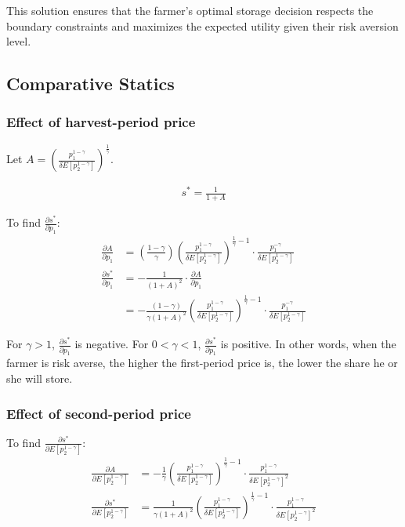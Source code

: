 \documentclass[12pt]{article}
\begin{document}
This solution ensures that the farmer's optimal storage decision respects the boundary constraints and maximizes the expected utility given their risk aversion level.


\subsection{Comparative Statics}

\subsubsection{Effect of harvest-period price}

Let $A = \left( \frac{p_1^{1 - \gamma}}{\delta E[p_2^{1 - \gamma}]} \right)^{\frac{1}{\gamma}}$.

\begin{align*}
    s^* = \frac{1}{1 + A}
\end{align*}

To find $\frac{\partial s^*}{\partial p_1}$:
\begin{align*}
    \frac{\partial A}{\partial p_1} &= \left( \frac{1 - \gamma}{\gamma} \right) \left( \frac{p_1^{1 - \gamma}}{\delta E[p_2^{1 - \gamma}]} \right)^{\frac{1}{\gamma} - 1} \cdot \frac{p_1^{-\gamma}}{\delta E[p_2^{1 - \gamma}]} \\
    \frac{\partial s^*}{\partial p_1} &= -\frac{1}{(1 + A)^2} \cdot \frac{\partial A}{\partial p_1} \\
    &= -\frac{(1 - \gamma)}{\gamma (1 + A)^2} \left( \frac{p_1^{1 - \gamma}}{\delta E[p_2^{1 - \gamma}]} \right)^{\frac{1}{\gamma} - 1} \cdot \frac{p_1^{-\gamma}}{\delta E[p_2^{1 - \gamma}]}
\end{align*}

For $\gamma > 1$, $\frac{\partial s^*}{\partial p_1}$ is negative. For $0 < \gamma < 1$, $\frac{\partial s^*}{\partial p_1}$ is positive. In other words, when the farmer is risk averse, the higher the first-period price is, the lower the share he or she will store.

\subsubsection{Effect of second-period price}

To find $\frac{\partial s^*}{\partial E[p_2^{1 - \gamma}]}$:
\begin{align*}
    \frac{\partial A}{\partial E[p_2^{1 - \gamma}]} &= -\frac{1}{\gamma} \left( \frac{p_1^{1 - \gamma}}{\delta E[p_2^{1 - \gamma}]} \right)^{\frac{1}{\gamma} - 1} \cdot \frac{p_1^{1 - \gamma}}{\delta E[p_2^{1 - \gamma}]^2} \\
    \frac{\partial s^*}{\partial E[p_2^{1 - \gamma}]} &= \frac{1}{\gamma (1 + A)^2} \left( \frac{p_1^{1 - \gamma}}{\delta E[p_2^{1 - \gamma}]} \right)^{\frac{1}{\gamma} - 1} \cdot \frac{p_1^{1 - \gamma}}{\delta E[p_2^{1 - \gamma}]^2}
\end{align*}
\end{document}
